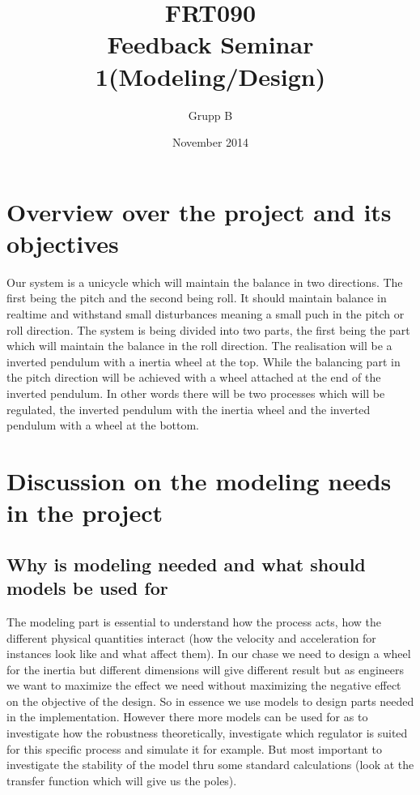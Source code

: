 \documentclass{article}
\author{Grupp B}
\title{FRT090 \\Feedback Seminar 1(Modeling/Design)  }				%
\date{November 2014}
\begin{document}
\maketitle	%
\newpage


\section {Overview over the project and its objectives}

Our system is a unicycle which will maintain the balance in two directions. The first being the pitch and the second being roll. It should maintain balance in realtime and withstand small disturbances meaning a small puch in the pitch or roll direction. The system is being divided into two parts, the first being the part which will maintain the balance in the roll direction. The realisation will be a inverted pendulum with a inertia wheel at the top. While the balancing part in the pitch direction will be achieved with a wheel attached at the end of the inverted pendulum. In other words there will be two processes which will be regulated, the inverted pendulum  with the inertia wheel and the inverted pendulum with a wheel at the bottom. 



\section{Discussion on the modeling needs in the project}

\subsection{Why is modeling needed and what should models be used for}

The modeling part is essential to understand how the process acts, how the different physical quantities interact (how the velocity and acceleration for instances look like and what affect them). In our chase we need to design a wheel for the inertia but different dimensions will give different result but as engineers we want to maximize the effect we need without maximizing the negative effect on the objective of the design. So in essence we use models to design parts needed in the implementation. However there more models can be used for as to investigate how the robustness theoretically, investigate which regulator is suited for this specific process and simulate it for example. But most important to investigate the stability of the model thru some standard calculations (look at the transfer function which will give us the poles).   
\end{document}
